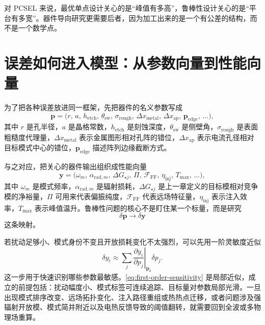 \begin{IntuitionBox}
对 PCSEL 来说，最优单点设计关心的是“峰值有多高”，鲁棒性设计关心的是“平台有多宽”。器件导向研究更需要后者，因为加工出来的是一个有公差的结构，而不是一个数学点。
\end{IntuitionBox}

\section{误差如何进入模型：从参数向量到性能向量}
为了把各种误差放进同一框架，先把器件的名义参数写成
\begin{equation}
\bm{p}
=
\bigl(
r,\,
a,\,
h_{\mathrm{etch}},\,
\theta_{\mathrm{sw}},\,
\sigma_{\mathrm{rough}},\,
\Delta x_{\mathrm{metal}},\,
\Delta x_{\mathrm{ap}},\,
\bm{p}_{\mathrm{edge}},\,
\dots
\bigr),
\label{eq:param-vector}
\end{equation}
其中 $r$ 是孔半径，$a$ 是晶格常数，$h_{\mathrm{etch}}$ 是刻蚀深度，$\theta_{\mathrm{sw}}$ 是侧壁角，$\sigma_{\mathrm{rough}}$ 是表面粗糙度代理量，$\Delta x_{\mathrm{metal}}$ 表示金属图形相对孔阵的错位，$\Delta x_{\mathrm{ap}}$ 表示电流孔径相对目标模式中心的错位，$\bm{p}_{\mathrm{edge}}$ 描述阵列边缘截断方式。

与之对应，把关心的器件输出组织成性能向量
\begin{equation}
\bm{y}
=
\bigl(
\omega_m,\,
\alpha_{\mathrm{rad},m},\,
\Delta G_{\star j},\,
\Pi,\,
\mathcal{F}_{\mathrm{FF}},\,
\eta_{\mathrm{inj}},\,
T_{\max},\,
\dots
\bigr),
\label{eq:output-vector}
\end{equation}
其中 $\omega_m$ 是模式频率，$\alpha_{\mathrm{rad},m}$ 是辐射损耗，$\Delta G_{\star j}$ 是上一章定义的目标模相对竞争模的净裕量，$\Pi$ 可用来代表偏振纯度，$\mathcal{F}_{\mathrm{FF}}$ 代表远场特征量，$\eta_{\mathrm{inj}}$ 表示注入效率，$T_{\max}$ 表示峰值温升。鲁棒性问题的核心不是盯住某一个标量，而是研究
\begin{equation}
\delta \bm{p}
\longrightarrow
\delta \bm{y}
\label{eq:delta-map}
\end{equation}
这条映射。

若扰动足够小、模式身份不变且开放损耗变化不太强烈，可以先用一阶灵敏度近似
\begin{equation}
\delta y_i
\approx
\sum_j
\left.
\frac{\partial y_i}{\partial p_j}
\right|_{\bm{p}_0}
\delta p_j.
\label{eq:first-order-sensitivity}
\end{equation}
这一步用于快速识别哪些参数最敏感。\cref{eq:first-order-sensitivity} 是局部近似，成立的前提包括：扰动幅度小、模式标签可连续追踪、目标量对参数局部光滑。一旦出现模式排序改变、远场拓扑变化、注入路径重组或热热点迁移，或者问题涉及强辐射开放模、模式简并附近以及电热反馈导致的阈值翻转，就需要回到全波或多物理场重算。

